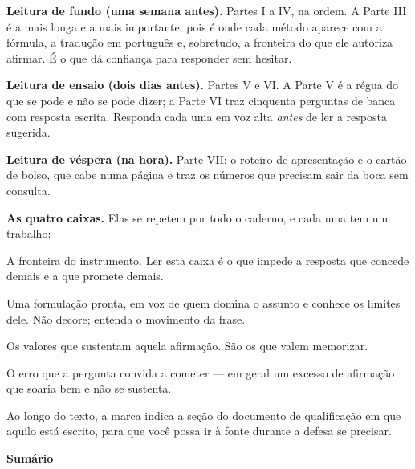 \vspace{4pt}
\textbf{Leitura de fundo (uma semana antes).} Partes I a IV, na ordem. A Parte
III é a mais longa e a mais importante, pois é onde cada método aparece com a
fórmula, a tradução em português e, sobretudo, a fronteira do que ele autoriza
afirmar. É o que dá confiança para responder sem hesitar.

\textbf{Leitura de ensaio (dois dias antes).} Partes V e VI. A Parte V é a régua
do que se pode e não se pode dizer; a Parte VI traz cinquenta perguntas de banca
com resposta escrita. Responda cada uma em voz alta \emph{antes} de ler a
resposta sugerida.

\textbf{Leitura de véspera (na hora).} Parte VII: o roteiro de apresentação e o
cartão de bolso, que cabe numa página e traz os números que precisam sair da
boca sem consulta.

\vspace{10pt}
{\color{cortinta}\bfseries As quatro caixas.} Elas se repetem por todo o
caderno, e cada uma tem um trabalho:

\vspace{4pt}
\begin{naodiz}
A fronteira do instrumento. Ler esta caixa é o que impede a resposta que concede
demais e a que promete demais.
\end{naodiz}

\begin{nabanca}
Uma formulação pronta, em voz de quem domina o assunto e conhece os limites
dele. Não decore; entenda o movimento da frase.
\end{nabanca}

\begin{ancora}
Os valores que sustentam aquela afirmação. São os que valem memorizar.
\end{ancora}

\begin{armadilha}[Armadilha]
O erro que a pergunta convida a cometer --- em geral um excesso de afirmação que
soaria bem e não se sustenta.
\end{armadilha}

\vspace{8pt}
Ao longo do texto, a marca  indica a seção do documento de
qualificação em que aquilo está escrito, para que você possa ir à fonte durante
a defesa se precisar.

\clearpage
{}
{\color{cortinta}\Large\bfseries Sumário}
\vspace{-6pt}
\makeatletter\renewcommand{\tableofcontents}{}\makeatother
\tableofcontents
\clearpage
{}
